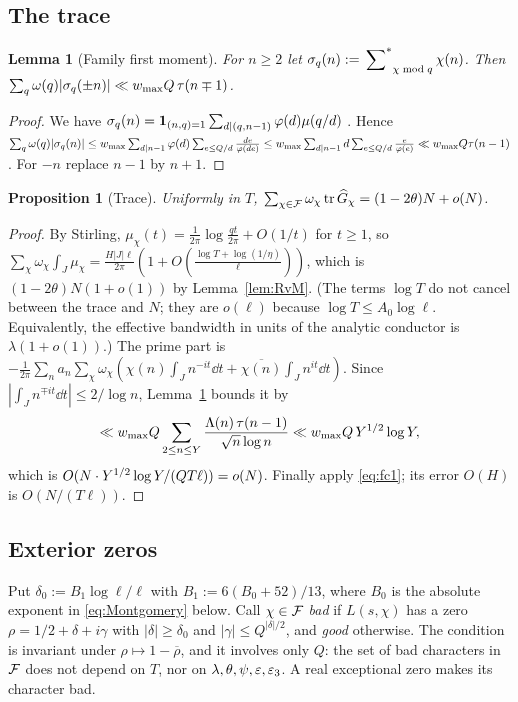 \documentclass[11pt]{amsart}
\newtheorem{proposition}[theorem]{Proposition}
\newtheorem{lemma}[theorem]{Lemma}
\theoremstyle{definition}
\theoremstyle{remark}
\numberwithin{equation}{section}
\begin{document}
\subsection{The trace}
\begin{lemma}[Family first moment]\label{lem:firstmoment}
For $n\ge2$ let $\sigma_q(n):=\sideset{}{^{*}}\sum_{\chi\bmod q}\chi(n)$. Then $\sum_q\omega(q)|\sigma_q(\pm n)|\ll w_{\max} Q\,\tau(n\mp1)$.
\end{lemma}
\begin{proof}
We have $\sigma_q(n)=\mathbf 1_{(n,q)=1}\sum_{d\mid(q,n-1)}\varphi(d)\mu(q/d)$ \cite[(3.9)]{IK04}. Hence
$\sum_q\omega(q)|\sigma_q(n)|\le w_{\max}\sum_{d\mid n-1}\varphi(d)\sum_{e\le Q/d}\frac{de}{\varphi(de)}\le w_{\max}\sum_{d\mid n-1}d\sum_{e\le Q/d}\frac e{\varphi(e)}\ll w_{\max} Q\tau(n-1)$. For $-n$ replace $n-1$ by $n+1$.
\end{proof}

\begin{proposition}[Trace]\label{prop:trace}
Uniformly in $T$, $\sum_{\chi\in\mathcal F}\omega_\chi\operatorname{tr}\widehat G_\chi=(1-2\theta)N+o(N)$.
\end{proposition}
\begin{proof}
By Stirling, $\mu_\chi(t)=\frac1{2\pi}\log\frac{qt}{2\pi}+O(1/t)$ for $t\ge1$, so $\sum_\chi\omega_\chi\int_J\mu_\chi=\frac{H|J|\ell}{2\pi}(1+O(\frac{\log T+\log(1/\eta)}\ell))$, which is $(1-2\theta)N(1+o(1))$ by Lemma~\ref{lem:RvM}. (The terms $\log T$ do not cancel between the trace and $N$; they are $o(\ell)$ because $\log T\le A_0\log\ell$. Equivalently, the effective bandwidth in units of the analytic conductor is $\lambda(1+o(1))$.) The prime part is $-\frac1{2\pi}\sum_na_n\sum_\chi\omega_\chi(\chi(n)\int_Jn^{-it}\dd t+\overline{\chi(n)}\int_Jn^{it}\dd t)$. Since $|\int_Jn^{\mp it}\dd t|\le2/\log n$, Lemma~\ref{lem:firstmoment} bounds it by
\[
\ll w_{\max} Q\sum_{2\le n\le Y}\frac{\Lambda(n)\,\tau(n-1)}{\sqrt n\log n}\ll w_{\max} Q\,Y^{1/2}\log Y,
\]
which is $O(N\cdot Y^{1/2}\log Y/(QT\ell))=o(N)$. Finally apply \eqref{eq:fc1}; its error $O(H)$ is $O(N/(T\ell))$.
\end{proof}

\subsection{Exterior zeros}\label{sec:exterior}
Put $\delta_0:=B_1\log\ell/\ell$ with $B_1:=6(B_0+52)/13$, where $B_0$ is the absolute exponent in \eqref{eq:Montgomery} below. Call $\chi\in\mathcal F$ \emph{bad} if $L(s,\chi)$ has a zero $\rho=1/2+\delta+i\gamma$ with $|\delta|\ge\delta_0$ and $|\gamma|\le Q^{|\delta|/2}$, and \emph{good} otherwise. The condition is invariant under $\rho\mapsto1-\overline\rho$, and it involves only $Q$: the set of bad characters in $\mathcal F$ does not depend on $T$, nor on $\lambda,\theta,\psi,\varepsilon,\varepsilon_3$. A real exceptional zero makes its character bad.
\end{document}

